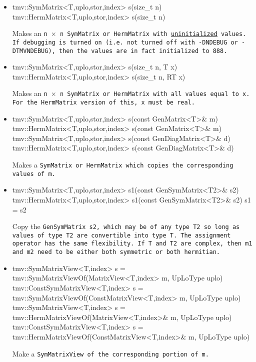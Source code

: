 \begin{itemize}
\item 
\begin{tmvcode}
tmv::SymMatrix<T,uplo,stor,index> s(size_t n)
tmv::HermMatrix<T,uplo,stor,index> s(size_t n)
\end{tmvcode}
Makes an \tt{n} $\times$ \tt{n} \tt{SymMatrix} or \tt{HermMatrix}
with \underline{uninitialized} values.
If debugging is turned on (i.e. not turned off
with \tt{-DNDEBUG} or \tt{-DTMVNDEBUG}), then the values are in fact initialized to 888.  

\item
\begin{tmvcode}
tmv::SymMatrix<T,uplo,stor,index> s(size_t n, T x)
tmv::HermMatrix<T,uplo,stor,index> s(size_t n, RT x)
\end{tmvcode}
Makes an \tt{n} $\times$ \tt{n} \tt{SymMatrix} or \tt{HermMatrix} 
with all values equal to \tt{x}.
For the \tt{HermMatrix} version of this, \tt{x} must be real.

\item 
\begin{tmvcode}
tmv::SymMatrix<T,uplo,stor,index> s(const GenMatrix<T>& m)
tmv::HermMatrix<T,uplo,stor,index> s(const GenMatrix<T>& m)
tmv::SymMatrix<T,uplo,stor,index> s(const GenDiagMatrix<T>& d)
tmv::HermMatrix<T,uplo,stor,index> s(const GenDiagMatrix<T>& d)
\end{tmvcode}
Makes a \tt{SymMatrix} or \tt{HermMatrix} which copies the corresponding values of \tt{m}.

\item
\begin{tmvcode}
tmv::SymMatrix<T,uplo,stor,index> s1(const GenSymMatrix<T2>& s2)
tmv::HermMatrix<T,uplo,stor,index> s1(const GenSymMatrix<T2>& s2)
s1 = s2
\end{tmvcode}
Copy the \tt{GenSymMatrix s2}, which may be of any type \tt{T2} so long
as values of type \tt{T2} are convertible into type \tt{T}.
The assignment operator has the same flexibility.
If \tt{T} and \tt{T2} are complex, then \tt{m1} and \tt{m2} need to be
either both symmetric or both hermitian.

\item
\begin{tmvcode}
tmv::SymMatrixView<T,index> s = 
      tmv::SymMatrixViewOf(MatrixView<T,index> m, UpLoType uplo)
tmv::ConstSymMatrixView<T,index> s = 
      tmv::SymMatrixViewOf(ConstMatrixView<T,index> m, UpLoType uplo)
tmv::SymMatrixView<T,index> s = 
      tmv::HermMatrixViewOf(MatrixView<T,index>& m, UpLoType uplo)
tmv::ConstSymMatrixView<T,index> s = 
      tmv::HermMatrixViewOf(ConstMatrixView<T,index>& m, UpLoType uplo)
\end{tmvcode}
Make a \tt{SymMatrixView} of the corresponding portion of \tt{m}.


\end{itemize}
